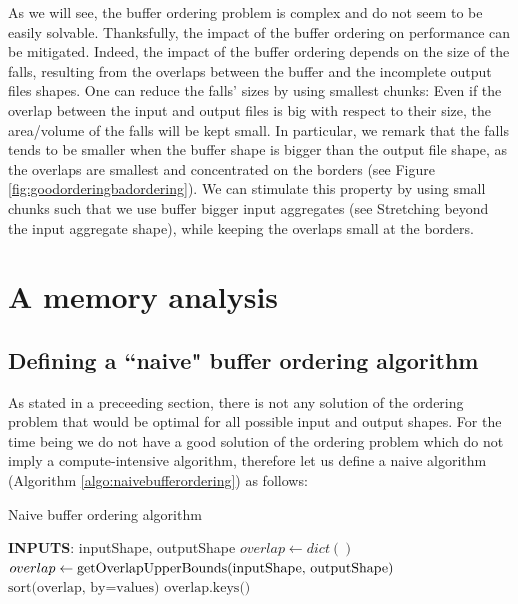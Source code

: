 \documentclass[conference]{IEEEtran}
\begin{document}
As we will see, the buffer ordering problem is complex and do not seem to be easily solvable.
Thanksfully, the impact of the buffer ordering on performance can be mitigated.
Indeed, the impact of the buffer ordering depends on the size of the falls, resulting from the overlaps between the buffer and the incomplete output files shapes.
One can reduce the falls' sizes by using smallest chunks:
Even if the overlap between the input and output files is big with respect to their size, the area/volume of the falls will be kept small.
In particular, we remark that the falls tends to be smaller when the buffer shape is bigger than the output file shape, as the overlaps are smallest and concentrated on the borders (see Figure \ref{fig:goodorderingbadordering}).
We can stimulate this property by using small chunks such that we use buffer bigger input aggregates (see Stretching beyond the input aggregate shape), while keeping the overlaps small at the borders.


\section*{A memory analysis}

\subsection{Defining a ``naive" buffer ordering algorithm}
As stated in a preceeding section, there is not any solution of the ordering problem that would be optimal for all possible input and output shapes.
For the time being we do not have a good solution of the ordering problem which do not imply a compute-intensive algorithm, therefore let us define a naive algorithm (Algorithm \ref{algo:naivebufferordering}) as follows:

\begin{algorithm}[H]
  \caption{Naive buffer ordering algorithm}
  \begin{algorithmic}[1]
  \STATE \textbf{INPUTS}: inputShape, outputShape
  \STATE $overlap \leftarrow dict()$
  \STATE $overlap \leftarrow \textrm{getOverlapUpperBounds(\textrm{inputShape, outputShape})}$
  \STATE $\textrm{sort(overlap, by=values)}$
  \RETURN $\textrm{overlap.keys()}$

  \end{algorithmic}
  \label{algo:naivebufferordering}
\end{algorithm}
\end{document}

